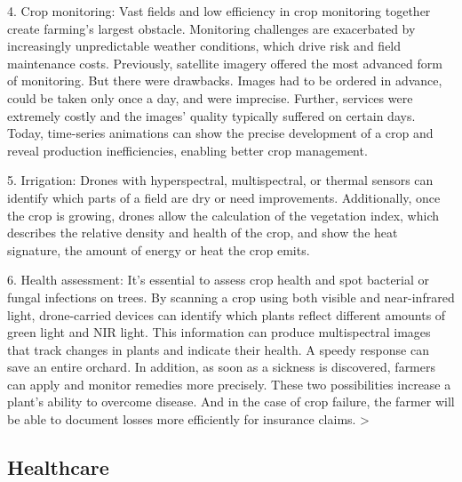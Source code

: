 4. Crop monitoring: 
Vast fields and low efficiency in crop monitoring together 
create farming’s largest obstacle. 
Monitoring challenges are exacerbated 
by increasingly unpredictable weather conditions, 
which drive risk and field maintenance costs. 
Previously, satellite imagery offered the most advanced form of monitoring. 
But there were drawbacks. 
Images had to be ordered in advance, 
could be taken only once a day, 
and were imprecise. 
Further, services were extremely costly and 
the images’ quality typically suffered on certain days. 
Today, time-series animations 
can show the precise development of a crop and 
reveal production inefficiencies, 
enabling better crop management.

5. Irrigation: 
Drones with hyperspectral, multispectral, or thermal sensors 
can identify which parts of a field are dry or need improvements. 
Additionally, once the crop is growing, 
drones allow the calculation of the vegetation index, 
which describes the relative density and health of the crop, 
and show the heat signature, the amount of energy or heat the crop emits.

6. Health assessment: 
It’s essential to assess crop health and 
spot bacterial or fungal infections on trees. 
By scanning a crop using both visible and near-infrared light, 
drone-carried devices can identify 
which plants reflect different amounts of green light and NIR light. 
This information can produce multispectral images 
that track changes in plants and indicate their health. 
A speedy response can save an entire orchard. 
In addition, as soon as a sickness is discovered, 
farmers can apply and monitor remedies more precisely. 
These two possibilities increase a plant’s ability to overcome disease. 
And in the case of crop failure, 
the farmer will be able to document losses more efficiently for insurance claims.
>



\subsection{Healthcare}

